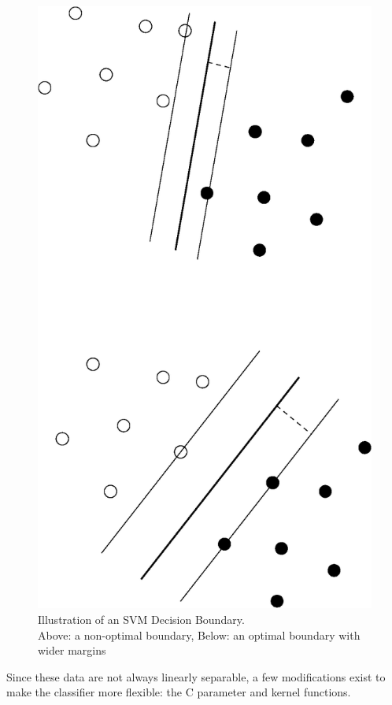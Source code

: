 \documentclass[12pt]{article}
\begin{document}
\begin{figure}[h!]
  \centering
  \includegraphics[scale=1]{classifier}
  \caption[Illustration of an SVM Decision Boundary]
   {Illustration of an SVM Decision Boundary. \\ Above: a non-optimal boundary, Below: an optimal boundary with wider margins}
  \label{fig:Classifier}
\end{figure}

Since these data are not always linearly separable, a few modifications exist to make the classifier more flexible: the C parameter and kernel functions. 
\end{document}

